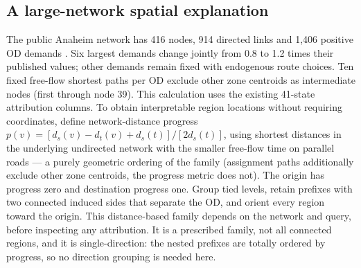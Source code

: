 \subsection{A large-network spatial explanation}\label{sec:anaheim}
The public Anaheim network has 416 nodes, 914 directed links and 1,406 positive OD demands \citep{tnfrc2024transportation}. Six largest demands change jointly from 0.8 to 1.2 times their published values; other demands remain fixed with endogenous route choices. Ten fixed free-flow shortest paths per OD exclude other zone centroids as intermediate nodes (first through node 39). This calculation uses the existing 41-state attribution columns.
To obtain interpretable region locations without requiring coordinates, define network-distance progress $p(v)=[d_s(v)-d_t(v)+d_s(t)]/[2d_s(t)]$, using shortest distances in the underlying undirected network with the smaller free-flow time on parallel roads --- a purely geometric ordering of the family (assignment paths additionally exclude other zone centroids, the progress metric does not). The origin has progress zero and destination progress one. Group tied levels, retain prefixes with two connected induced sides that separate the OD, and orient every region toward the origin. This distance-based family depends on the network and query, before inspecting any attribution. It is a prescribed family, not all connected regions, and it is single-direction: the nested prefixes are totally ordered by progress, so no direction grouping is needed here.

